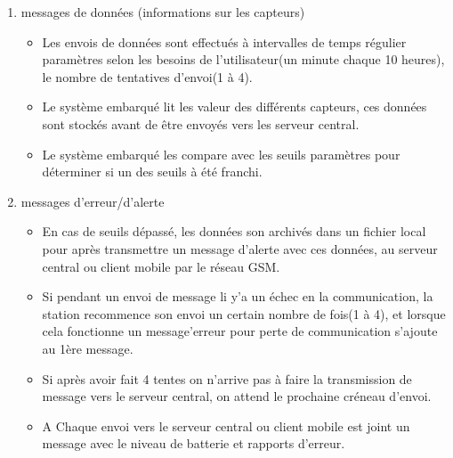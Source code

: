 \documentclass [a4paper] {report}
\begin{document}
\begin{description}
\begin{enumerate}
	\item messages de données (informations sur les capteurs)\\
		\begin{itemize}
		\item Les envois de données sont effectués à intervalles de temps régulier paramètres selon les
		 besoins de l'utilisateur(un minute chaque 10 heures), le nombre de tentatives d'envoi(1 à 4).\\
		\item Le système embarqué lit les valeur des différents capteurs, ces données sont stockés avant 
		de être envoyés vers les serveur central.\\
		\item Le système embarqué les compare avec les seuils paramètres pour déterminer si un des seuils à été franchi. \\
		\end{itemize}

	\item messages d'erreur/d'alerte\\
		\begin{itemize}
		\item En cas de seuils dépassé, les données son archivés dans un fichier local pour après  transmettre
		 un message d'alerte avec ces données, au serveur central ou client mobile par le réseau GSM. \\
		\item Si pendant un envoi de message li y'a un échec en la communication, la station recommence son envoi
		 un certain nombre de fois(1 à 4), et lorsque cela fonctionne un message'erreur pour perte de communication
		  s'ajoute au 1ère message.\\
		\item Si après avoir fait 4 tentes on n'arrive pas à faire la transmission de message vers le serveur central, on
		 attend le prochaine créneau d'envoi.\\
		\item A Chaque envoi vers le serveur central ou client mobile est joint un message avec le niveau de batterie et rapports d'erreur.\\
		\end{itemize}\hfill\\
	\end{enumerate}


\end{description}
\end{document}
